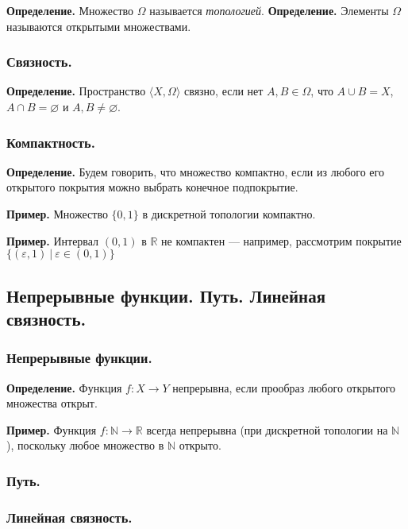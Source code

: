 \documentclass[10pt,a4paper,oneside]{article}
\begin{document}
\noindent \textbf{ Определение. } Множество $\Omega$ называется \emph{топологией}.
\noindent \textbf{ Определение. } Элементы $\Omega$ называются открытыми множествами.

\subsubsection{Связность.}

\noindent \textbf{ Определение. } Пространство $\langle X, \Omega\rangle$ связно, если нет $A,B \in \Omega$, что $A\cup B = X$,
$A \cap B = \varnothing$ и $A,B \ne \varnothing$.

\subsubsection{Компактность.}

\noindent \textbf{ Определение. } Будем говорить, что множество компактно, если из любого его открытого покрытия можно выбрать конечное
подпокрытие.

\noindent \textbf{ Пример. } Множество $\{0,1\}$ в дискретной топологии компактно.


\noindent \textbf{ Пример. } Интервал $(0,1)$ в $\mathbb{R}$ не компактен --- например, рассмотрим покрытие $\{(\varepsilon,1)\ |\ \varepsilon\in(0,1)\}$ 

\subsection{Непрерывные функции. Путь. Линейная связность. }
\subsubsection{Непрерывные функции.}

\noindent \textbf{ Определение. } 
Функция $f: X \rightarrow Y$ непрерывна, если прообраз любого открытого множества открыт.

\noindent \textbf{ Пример. } 
Функция $f: \mathbb{N} \rightarrow \mathbb{R}$ всегда непрерывна (при дискретной топологии на $\mathbb{N}$), 
поскольку любое множество в $\mathbb{N}$ открыто.

\subsubsection{Путь.}

\subsubsection{Линейная связность.}
\end{document}
